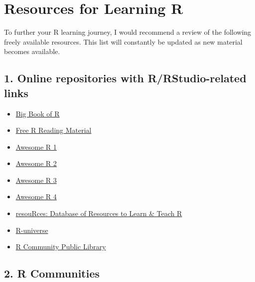 \documentclass[
  letterpaper,
  DIV=11,
  numbers=noendperiod]{scrreprt}
\providecommand{\tightlist}{%
  \setlength{\itemsep}{0pt}\setlength{\parskip}{0pt}}\usepackage{longtable,booktabs,array}
\begin{document}
\chapter{Resources for Learning R}\label{sec-appendix-1}

To further your R learning journey, I would recommend a review of the
following freely available resources. This list will constantly be
updated as new material becomes available.

\section{1. Online repositories with R/RStudio-related
links}\label{online-repositories-with-rrstudio-related-links}

\begin{itemize}
\tightlist
\item
  \href{https://www.bigbookofr.com/}{Big Book of R}
\item
  \href{https://committedtotape.shinyapps.io/freeR/}{Free R Reading
  Material}
\item
  \href{https://github.com/qinwf/awesome-R}{Awesome R 1}
\item
  \href{https://github.com/uhub/awesome-r}{Awesome R 2}
\item
  \href{https://github.com/ktaranov/AwesomeR}{Awesome R 3}
\item
  \href{https://github.com/iamericfletcher/awesome-r-learning-resources}{Awesome
  R 4}
\item
  \href{https://www.resourcesdatabase.com/}{resouRces: Database of
  Resources to Learn \& Teach R}
\item
  \href{https://r-universe.dev/search/}{R-universe}
\item
  \href{https://rviews.rstudio.com/2021/11/04/bookdown-org/}{R Community
  Public Library}
\end{itemize}

\section{2. R Communities}\label{r-communities}
\end{document}
